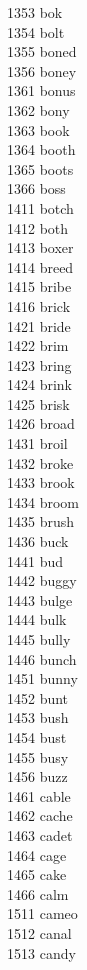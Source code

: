 1353 bok \\
1354 bolt \\
1355 boned \\
1356 boney \\
1361 bonus \\
1362 bony \\
1363 book \\
1364 booth \\
1365 boots \\
1366 boss \\
1411 botch \\
1412 both \\
1413 boxer \\
1414 breed \\
1415 bribe \\
1416 brick \\
1421 bride \\
1422 brim \\
1423 bring \\
1424 brink \\
1425 brisk \\
1426 broad \\
1431 broil \\
1432 broke \\
1433 brook \\
1434 broom \\
1435 brush \\
1436 buck \\
1441 bud \\
1442 buggy \\
1443 bulge \\
1444 bulk \\
1445 bully \\
1446 bunch \\
1451 bunny \\
1452 bunt \\
1453 bush \\
1454 bust \\
1455 busy \\
1456 buzz \\
1461 cable \\
1462 cache \\
1463 cadet \\
1464 cage \\
1465 cake \\
1466 calm \\
1511 cameo \\
1512 canal \\
1513 candy \\
